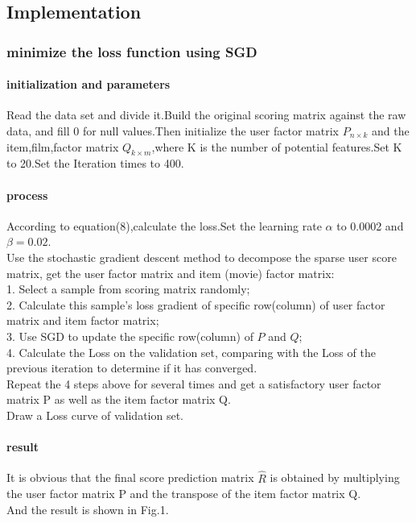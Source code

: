 \documentclass[journal, a4paper]{IEEEtran}
\begin{document}
\subsection{Implementation}
\subsubsection{minimize the loss function using SGD}
\paragraph{initialization and parameters}
Read the data set and divide it.Build the original scoring matrix against the raw data, and fill 0 for null values.Then initialize the user factor matrix $P_{n\times k}$ and the item,film,factor matrix $Q_{k\times m}$,where K is the number of potential features.Set K to 20.Set the Iteration times to 400.
\paragraph{process}
According to equation(8),calculate the loss.Set the learning rate $\alpha$ to 0.0002 and $\beta=0.02$.\\
Use the stochastic gradient descent method to decompose the sparse user score matrix, get the user factor matrix and item (movie) factor matrix: \\
1. Select a sample from scoring matrix randomly; \\
2. Calculate this sample's loss gradient of specific row(column) of user factor matrix and item factor matrix;\\
3. Use SGD to update the specific row(column) of $P$ and $Q$;\\
4. Calculate the Loss on the validation set, comparing with the Loss of the previous iteration to determine if it has converged.\\
Repeat the 4 steps above for several times and get a satisfactory user factor matrix P as well as the item factor matrix Q.\\
Draw a Loss curve of validation set.
\paragraph{result}
It is obvious that the final score prediction matrix $\hat{R}$ is obtained by multiplying the user factor matrix P and the transpose of the item factor matrix Q.\\
And the result is shown in Fig.1.
\end{document}
